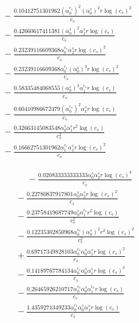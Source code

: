 \documentclass[10pt]{article}
\begin{document}
\begin{align*}
&{}  - \frac{0.10412751301962 \left(\alpha_{0}^{c_s}\right)^{2} \left(\alpha_{0}^s\right)^{2} r \log{\left(c_{s} \right)}^{2}}{c_{s}} \\
&{}  - \frac{0.42660617411381 \left(\alpha_{0}^s\right)^{2} \alpha_{1}^s r \log{\left(c_{s} \right)}}{c_{s}} \\
&{}  - \frac{0.23239116609368 \alpha_{0}^{c_s} \alpha_{2}^s r \log{\left(c_{s} \right)}^{2}}{c_{s}} \\
&{}  - \frac{0.23239116609368 \alpha_{0}^{c_s} \left(\alpha_{0}^s\right)^{3} r \log{\left(c_{s} \right)}^{2}}{c_{s}} \\
&{}  - \frac{0.58335484068555 \left(\alpha_{0}^s\right)^{2} \alpha_{1}^{c_s} r \log{\left(c_{s} \right)}}{c_{s}} \\
&{}  - \frac{0.60410986672479 \left(\alpha_{0}^{c_s}\right)^{2} \alpha_{1}^s r \log{\left(c_{s} \right)}}{c_{s}} \\
&{}  - \frac{0.32663145083548 \alpha_{0}^s \alpha_{1}^s r^{2} \log{\left(c_{s} \right)}}{c_{s}^{2}} \\
&{}  - \frac{0.16662751301962 \alpha_{1}^{c_s} \alpha_{1}^s r \log{\left(c_{s} \right)}^{2}}{c_{s}}
\end{align*}

\begin{align*}
\phantom{R_{0,5}} &\phantom{={}}{}  - \frac{0.020833333333333 \alpha_{0}^s \alpha_{2}^s r \log{\left(c_{s} \right)}^{4}}{c_{s}} \\
&{}  - \frac{0.22780837917801 \alpha_{0}^s \alpha_{2}^s r \log{\left(c_{s} \right)}^{2}}{c_{s}} \\
&{}  - \frac{0.23758419687749 \alpha_{0}^s \alpha_{1}^{c_s} r^{2} \log{\left(c_{s} \right)}}{c_{s}^{2}} \\
&{}  - \frac{0.12235302850968 \alpha_{0}^{c_s} \left(\alpha_{0}^s\right)^{2} r^{2} \log{\left(c_{s} \right)}^{2}}{c_{s}^{2}} \\
&{}  + \frac{0.69717349828103 \alpha_{0}^{c_s} \alpha_{0}^s \alpha_{1}^s r \log{\left(c_{s} \right)}^{2}}{c_{s}} \\
&{}  - \frac{0.14189767784134 \alpha_{0}^{c_s} \alpha_{0}^s \alpha_{1}^s r \log{\left(c_{s} \right)}^{3}}{c_{s}} \\
&{}  - \frac{0.26465926210717 \alpha_{0}^{c_s} \alpha_{0}^s \alpha_{1}^{c_s} r \log{\left(c_{s} \right)}}{c_{s}} \\
&{}  - \frac{1.4359271349233 \alpha_{0}^{c_s} \alpha_{0}^s \alpha_{1}^s r \log{\left(c_{s} \right)}}{c_{s}}
\end{align*}
\end{document}
